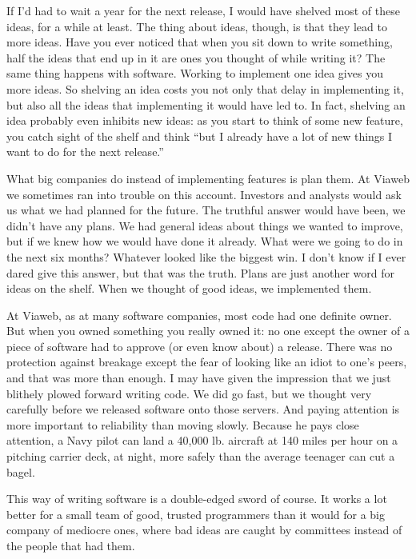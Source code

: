 \documentclass[12pt]{book}
\begin{document}
If I'd had to wait a year for the next release, I would have shelved
most of these ideas, for a while at least. The thing about ideas,
though, is that they lead to more ideas. Have you ever noticed that when
you sit down to write something, half the ideas that end up in it are
ones you thought of while writing it? The same thing happens with
software. Working to implement one idea gives you more ideas. So
shelving an idea costs you not only that delay in implementing it, but
also all the ideas that implementing it would have led to. In fact,
shelving an idea probably even inhibits new ideas: as you start to think
of some new feature, you catch sight of the shelf and think ``but I
already have a lot of new things I want to do for the next release.''

What big companies do instead of implementing features is plan them. At
Viaweb we sometimes ran into trouble on this account. Investors and
analysts would ask us what we had planned for the future. The truthful
answer would have been, we didn't have any plans. We had general ideas
about things we wanted to improve, but if we knew how we would have done
it already. What were we going to do in the next six months? Whatever
looked like the biggest win. I don't know if I ever dared give this
answer, but that was the truth. Plans are just another word for ideas on
the shelf. When we thought of good ideas, we implemented them.

At Viaweb, as at many software companies, most code had one definite
owner. But when you owned something you really owned it: no one except
the owner of a piece of software had to approve (or even know about) a
release. There was no protection against breakage except the fear of
looking like an idiot to one's peers, and that was more than enough. I
may have given the impression that we just blithely plowed forward
writing code. We did go fast, but we thought very carefully before we
released software onto those servers. And paying attention is more
important to reliability than moving slowly. Because he pays close
attention, a Navy pilot can land a 40,000 lb. aircraft at 140 miles per
hour on a pitching carrier deck, at night, more safely than the average
teenager can cut a bagel.

This way of writing software is a double-edged sword of course. It works
a lot better for a small team of good, trusted programmers than it would
for a big company of mediocre ones, where bad ideas are caught by
committees instead of the people that had them.
\end{document}
